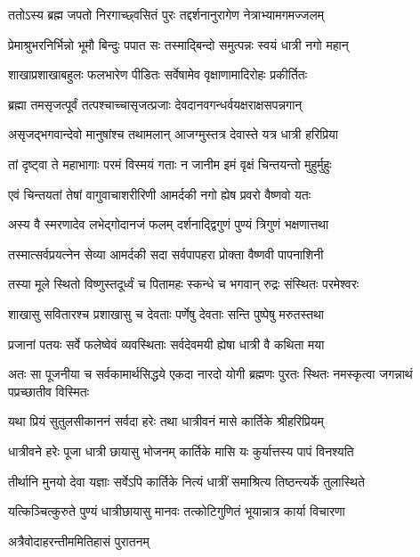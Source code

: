 \twolineshloka
{ततोऽस्य ब्रह्म जपतो निरगाच्छ्वसितं पुरः}
{तद्दर्शनानुरागेण नेत्राभ्यामगमज्जलम्} %

\twolineshloka
{प्रेमाश्रुभरनिर्भिन्नो भूमौ बिन्दुः पपात सः}
{तस्माद्बिन्दो समुत्पन्नः स्वयं धात्री नगो महान्} %

\twolineshloka
{शाखाप्रशाखाबहुलः फलभारेण पीडितः}
{सर्वेषामेव वृक्षाणामादिरोहः प्रकीर्तितः} %

\twolineshloka
{ब्रह्मा तमसृजत्पूर्वं तत्पश्चाच्चासृजत्प्रजाः}
{देवदानवगन्धर्वयक्षराक्षसपन्नगान्} %

\twolineshloka
{असृजद्भगवान्देवो मानुषांश्च तथामलान्}
{आजग्मुस्तत्र देवास्ते यत्र धात्री हरिप्रिया} %

\twolineshloka
{तां दृष्ट्वा ते महाभागाः परमं विस्मयं गताः}
{न जानीम इमं वृक्षं चिन्तयन्तो मुहुर्मुहुः} %

\twolineshloka
{एवं चिन्तयतां तेषां वागुवाचाशरीरिणी}
{आमर्दकी नगो ह्येष प्रवरो वैष्णवो यतः} %

\twolineshloka
{अस्य वै स्मरणादेव लभेद्गोदानजं फलम्}
{दर्शनाद्द्विगुणं पुण्यं त्रिगुणं भक्षणात्तथा} %

\twolineshloka
{तस्मात्सर्वप्रयत्नेन सेव्या आमर्दकी सदा}
{सर्वपापहरा प्रोक्ता वैष्णवी पापनाशिनी} %

\twolineshloka
{तस्या मूले स्थितो विष्णुस्तदूर्ध्वं च पितामहः}
{स्कन्धे च भगवान् रुद्रः संस्थितः परमेश्वरः} %

\twolineshloka
{शाखासु सवितारश्च प्रशाखासु च देवताः}
{पर्णेषु देवताः सन्ति पुष्पेषु मरुतस्तथा} %

\twolineshloka
{प्रजानां पतयः सर्वे फलेष्वेवं व्यवस्थिताः}
{सर्वदेवमयी ह्येषा धात्री वै कथिता मया} %

\threelineshloka
{अतः सा पूजनीया च सर्वकामार्थसिद्धये}
{एकदा नारदो योगी ब्रह्मणः पुरतः स्थितः}
{नमस्कृत्वा जगन्नाथं पप्रच्छातीव विस्मितः} %


\twolineshloka
{यथा प्रियं सुतुलसीकाननं सर्वदा हरेः}
{तथा धात्रीवनं मासे कार्तिके श्रीहरिप्रियम्} %


\twolineshloka
{धात्रीवने हरेः पूजा धात्री छायासु भोजनम्}
{कार्तिके मासि यः कुर्यात्तस्य पापं विनश्यति} %

\twolineshloka
{तीर्थानि मुनयो देवा यज्ञाः सर्वेऽपि कार्तिके}
{नित्यं धात्रीं समाश्रित्य तिष्ठन्त्यर्के तुलास्थिते} %

\twolineshloka
{यत्किञ्चित्कुरुते पुण्यं धात्रीछायासु मानवः}
{तत्कोटिगुणितं भूयान्नात्र कार्या विचारणा} %


\onelineshloka
{अत्रैवोदाहरन्तीममितिहासं पुरातनम्} %

